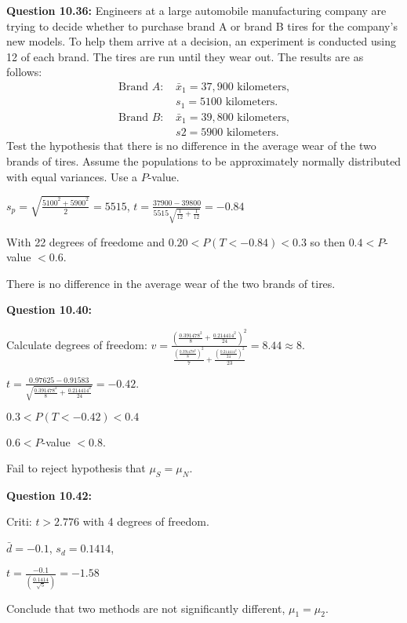 \documentclass{article}
\begin{document}
\textbf{Question 10.36:}
Engineers at a large automobile manufacturing 
company are trying to decide whether to purchase
brand A or brand B tires for the company’s new models. 
To help them arrive at a decision, an experiment
is conducted using 12 of each brand. The tires are run
until they wear out. The results are as follows:
\begin{align*}
    \text{Brand }A \text{: }& \bar{x}_1 = 37,900 \text{ kilometers,}\\
    &s_1 = 5100 \text{ kilometers.}\\
    \text{Brand }B \text{: }& \bar{x}_1 = 39,800 \text{ kilometers,}\\
    &s 2 = 5900 \text{ kilometers.}
\end{align*}
Test the hypothesis that there is no difference in the
average wear of the two brands of tires. Assume the
populations to be approximately normally distributed
with equal variances. Use a $P$-value.
\begin{description}
    \item $s_p=\sqrt{\frac{5100^2+5900^2}{2}}=5515$, $t=\frac{37900-39800}{5515\sqrt{\frac{1}{12}+\frac{1}{12}}}=-0.84$
    \item With 22 degrees of freedome and $0.20<P(T<-0.84) < 0.3$ so then $0.4 < P$-value $<0.6$.
    \item There is no difference in the average wear of the two brands of tires.
\end{description}

\textbf{Question 10.40:}
\begin{description}
    \item Calculate degrees of freedom: $v=\frac{(\frac{0.391478^2}{8} + \frac{0.214414^2}{24})^2}
    {\frac{(\frac{0.391478^2}{8})^2}{7} + \frac{(\frac{0.214414^2}{24})^2}{23}} = 8.44 \approx 8$.
    \item $t = \frac{0.97625 - 0.91583}{\sqrt{\frac{0.391478^2}{8}+\frac{0.214414^2}{24}}}=-0.42$.
    \item $0.3 < P(T<-0.42) < 0.4$
    \item $0.6 < P$-value $<0.8$.
    \item Fail to reject hypothesis that $\mu_S = \mu_N$.
\end{description}

\textbf{Question 10.42:}
\begin{description}
    \item Criti: $t > 2.776$ with 4 degrees of freedom.
    \item $\bar{d} = -0.1$, $s_d=0.1414$,
    \item $t=\frac{-0.1}{(\frac{0.1414}{\sqrt{5}})}=-1.58$
    \item Conclude that two methods are not significantly different, $\mu_1=\mu_2$.
\end{description}
\end{document}
